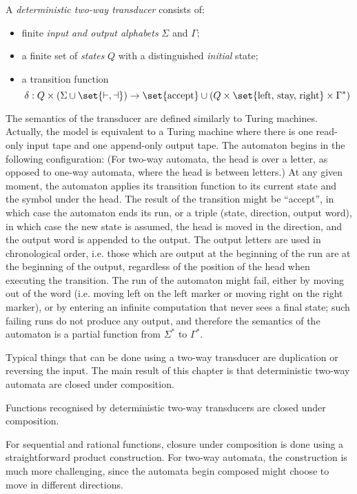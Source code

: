 \begin{definition}
	A \emph{deterministic two-way transducer} consists of:
\begin{itemize}
	\item finite \emph{input and output alphabets} $\Sigma$ and $\Gamma$;
\item  a finite set of \emph{states} $Q$ with a distinguished \emph{initial} state;
\item a transition function
$$ \delta : Q \times (\Sigma \cup \set{\vdash,\dashv}) \to \set{\text{accept}} \cup (Q \times \set{\text{left, stay, right}} \times \Gamma^*)$$

\end{itemize}

\end{definition}
The semantics of the transducer are defined similarly to Turing machines. Actually, the model is equivalent to a Turing machine where there is one read-only input tape and one append-only output tape. The automaton begins in the following configuration:
(For two-way automata, the head is over a letter, as opposed to one-way automata, where the head is between letters.) At any given moment, the automaton applies its transition function to its current state and the symbol under the head. The result of the transition might be ``accept'', in which case the automaton ends its run, or a triple (state, direction, output word), in which case the new state is assumed, the head is moved in the direction, and the output word is  appended to the output. The output letters are used in chronological order, i.e. those which are output at the beginning of the run are at the beginning of the output, regardless of the position of the head when executing the transition. The run of the automaton might fail, either by moving out of the word (i.e. moving left on the left marker or moving right on the right marker), or by entering an infinite computation that never sees a final state; such failing runs do not produce any output, and therefore the semantics of the automaton is a partial function from $\Sigma^*$ to $\Gamma^*$. 

Typical things that can be done using a two-way transducer are duplication or reversing the input. 
The main result of this chapter is that deterministic two-way automata are closed under composition.

\begin{theorem}\label{thm:two-way-compose}
	Functions recognised by deterministic two-way transducers are closed under composition.
\end{theorem}
 For sequential and rational functions, closure under composition is done using a straightforward product construction. For two-way automata, the construction is much more challenging, since the automata begin composed might choose to move in different directions. 
 
